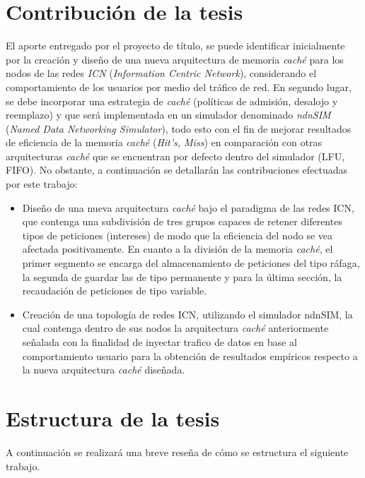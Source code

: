 \documentclass[12pt]{ociamthesis}  %
\begin{document}
\section{Contribución de la tesis}
El aporte entregado por el proyecto de título, se puede identificar inicialmente por la creación y diseño de una nueva arquitectura de memoria \textit{caché} para los nodos de las redes \textit{ICN} (\textit{Information Centric Network}), considerando el comportamiento de los usuarios por medio del tráfico de red. En segundo lugar, se debe incorporar una estrategia de \textit{caché} (políticas de admisión, desalojo y reemplazo) y que será implementada en un simulador denominado \textit{ndnSIM} (\textit{Named Data Networking Simulator}), todo esto con el fin de mejorar resultados de eficiencia de la memoria \textit{caché} (\textit{Hit's, Miss}) en comparación con otras arquitecturas \textit{caché} que se encuentran por defecto dentro del simulador (LFU, FIFO). No obstante, a continuación se detallarán las contribuciones efectuadas por este trabajo:\\
\begin{itemize}
	\item Diseño de una nueva arquitectura \textit{caché} bajo el paradigma de las redes ICN, que contenga una subdivisión de tres grupos capaces de retener diferentes tipos de peticiones (intereses) de modo que la eficiencia del nodo se vea afectada positivamente. En cuanto a la división de la memoria \textit{caché}, el primer segmento se encarga del almacenamiento de peticiones del tipo ráfaga, la segunda de guardar las de tipo permanente y para la última sección, la recaudación de peticiones de tipo variable.\\
	\item Creación de una topología de redes ICN, utilizando el simulador ndnSIM, la cual contenga dentro de sus nodos la arquitectura \textit{caché} anteriormente señalada con la finalidad de inyectar trafico de datos en base al comportamiento usuario para la obtención de resultados empíricos respecto a la nueva arquitectura \textit{caché} diseñada.\\
\end{itemize}


\section{Estructura de la tesis}
A continuación se realizará una breve reseña de cómo se estructura el siguiente trabajo.\\
\end{document}
